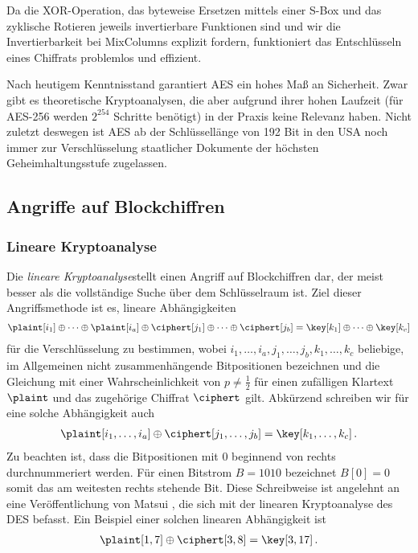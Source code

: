 Da die XOR-Operation, das byteweise Ersetzen mittels einer S-Box und das
zyklische Rotieren jeweils invertierbare Funktionen sind und wir die
Invertierbarkeit bei MixColumns explizit fordern, funktioniert das
Entschlüsseln eines Chiffrats problemlos und effizient. 

Nach heutigem Kenntnisstand garantiert AES ein hohes Maß an
Sicherheit. Zwar gibt es theoretische Kryptoanalysen, die aber aufgrund
ihrer hohen Laufzeit (für AES-256 werden $2^{254}$ Schritte benötigt) in
der Praxis keine Relevanz haben. Nicht zuletzt deswegen ist AES ab der
Schlüssellänge von 192 Bit in den USA noch immer zur Verschlüsselung
staatlicher Dokumente der höchsten Geheimhaltungsstufe zugelassen. 

\subsection{Angriffe auf Blockchiffren}
\subsubsection{Lineare Kryptoanalyse}\label{sssec:linKryptoanalyse}
Die \emph{lineare Kryptoanalyse}\indexLinCrypt stellt einen Angriff auf
Blockchiffren dar, der meist besser als die vollständige Suche über dem
Schlüsselraum ist. Ziel dieser Angriffsmethode ist es, lineare
Abhängigkeiten 
\begin{align}\label{approx}
  \plaint[i_{1}] \oplus \dots \oplus \plaint[i_{a}] \oplus \ciphert[j_{1}] \oplus \dots \oplus \ciphert[j_{b}] = \key[k_{1}] \oplus \dots \oplus \key[k_{c}]
\end{align}
für die Verschlüsselung zu bestimmen, wobei
$i_{1},\dots,i_{a},j_{1},\dots,j_{b},k_{1},\dots,k_{c}$ beliebige, im
Allgemeinen nicht zusammenhängende Bitpositionen bezeichnen und die
Gleichung mit einer Wahrscheinlichkeit von $p \neq \frac{1}{2}$ für
einen zufälligen Klartext $\plaint$ und das zugehörige Chiffrat
$\ciphert$ gilt. Abkürzend schreiben wir für eine solche Abhängigkeit
auch 
\begin{align*}
  \plaint[i_{1},\dots,i_{a}] \oplus \ciphert[j_{1},\dots,j_{b}] = \key[k_{1},\dots,k_{c}]\, .
\end{align*}
Zu beachten ist, dass die Bitpositionen mit $0$ beginnend von rechts
durchnummeriert werden. 
\label{matsui-notation}Für einen Bitstrom $B = 1010$ bezeichnet $B[0] =
0$ somit das am weitesten rechts stehende Bit. Diese Schreibweise ist
angelehnt an eine Veröffentlichung von Matsui \cite{Matsui1994}, die
sich mit der linearen Kryptoanalyse des DES befasst. 
Ein Beispiel einer solchen linearen Abhängigkeit ist
\begin{align*}
  \plaint[1, 7] \oplus \ciphert[3, 8] = \key[3, 17]\, .
\end{align*}

